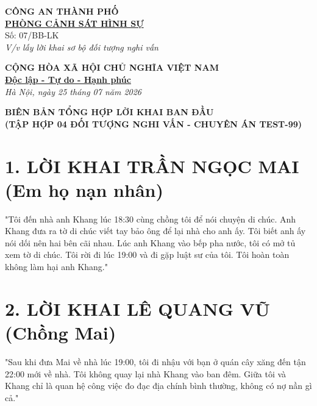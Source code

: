 \documentclass[12pt,a4paper]{article}
\begin{document}
\noindent
\begin{minipage}[t]{0.45\textwidth}
    \begin{center}
        \textbf{CÔNG AN THÀNH PHỐ}\\
        \textbf{\underline{PHÒNG CẢNH SÁT HÌNH SỰ}}\\[0.2cm]
        \small{Số: 07/BB-LK}\\
        \textit{V/v lấy lời khai sơ bộ đối tượng nghi vấn}
    \end{center}
\end{minipage}
\hfill
\begin{minipage}[t]{0.52\textwidth}
    \begin{center}
        \textbf{CỘNG HÒA XÃ HỘI CHỦ NGHĨA VIỆT NAM}\\
        \textbf{\underline{Độc lập - Tự do - Hạnh phúc}}\\[0.2cm]
        \textit{Hà Nội, ngày 25 tháng 07 năm 2026}
    \end{center}
\end{minipage}

\vspace{0.8cm}

\begin{center}
    \textbf{\LARGE BIÊN BẢN TỔNG HỢP LỜI KHAI BAN ĐẦU}\\
    \textbf{\large (TẬP HỢP 04 ĐỐI TƯỢNG NGHI VẤN - CHUYÊN ÁN TEST-99)}
\end{center}

\vspace{0.3cm}

\section*{1. LỜI KHAI TRẦN NGỌC MAI (Em họ nạn nhân)}
\begin{tcolorbox}[colback=blue!5!white,colframe=blue!75!black]
"Tôi đến nhà anh Khang lúc 18:30 cùng chồng tôi để nói chuyện di chúc. Anh Khang đưa ra tờ di chúc viết tay bảo ông để lại nhà cho anh ấy. Tôi biết anh ấy nói dối nên hai bên cãi nhau. Lúc anh Khang vào bếp pha nước, tôi có mở tủ xem tờ di chúc. Tôi rời đi lúc 19:00 và đi gặp luật sư của tôi. Tôi hoàn toàn không làm hại anh Khang."
\end{tcolorbox}

\section*{2. LỜI KHAI LÊ QUANG VŨ (Chồng Mai)}
\begin{tcolorbox}[colback=blue!5!white,colframe=blue!75!black]
"Sau khi đưa Mai về nhà lúc 19:00, tôi đi nhậu với bạn ở quán cây xăng đến tận 22:00 mới về nhà. Tôi không quay lại nhà Khang vào ban đêm. Giữa tôi và Khang chỉ là quan hệ công việc đo đạc địa chính bình thường, không có nợ nần gì cả."
\end{tcolorbox}
\end{document}
